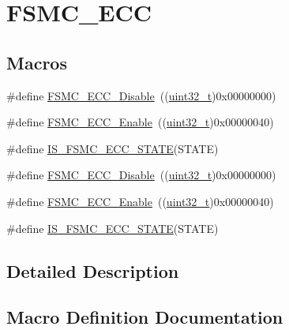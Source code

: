 \hypertarget{group___f_s_m_c___e_c_c}{}\section{F\+S\+M\+C\+\_\+\+E\+CC}
\label{group___f_s_m_c___e_c_c}
\subsection*{Macros}
\begin{DoxyCompactItemize}
\item 
\#define \hyperlink{group___f_s_m_c___e_c_c_ga9a3264c0718f5023fd106abea7ef806d}{F\+S\+M\+C\+\_\+\+E\+C\+C\+\_\+\+Disable}~((\hyperlink{_p_e___types_8h_a33594304e786b158f3fb30289278f5af}{uint32\+\_\+t})0x00000000)
\item 
\#define \hyperlink{group___f_s_m_c___e_c_c_ga9d940243830695412d4c98228bb5b763}{F\+S\+M\+C\+\_\+\+E\+C\+C\+\_\+\+Enable}~((\hyperlink{_p_e___types_8h_a33594304e786b158f3fb30289278f5af}{uint32\+\_\+t})0x00000040)
\item 
\#define \hyperlink{group___f_s_m_c___e_c_c_gaf1a7cb45edd8707bf4ea8aac96799c77}{I\+S\+\_\+\+F\+S\+M\+C\+\_\+\+E\+C\+C\+\_\+\+S\+T\+A\+TE}(S\+T\+A\+TE)
\item 
\#define \hyperlink{group___f_s_m_c___e_c_c_ga9a3264c0718f5023fd106abea7ef806d}{F\+S\+M\+C\+\_\+\+E\+C\+C\+\_\+\+Disable}~((\hyperlink{_p_e___types_8h_a33594304e786b158f3fb30289278f5af}{uint32\+\_\+t})0x00000000)
\item 
\#define \hyperlink{group___f_s_m_c___e_c_c_ga9d940243830695412d4c98228bb5b763}{F\+S\+M\+C\+\_\+\+E\+C\+C\+\_\+\+Enable}~((\hyperlink{_p_e___types_8h_a33594304e786b158f3fb30289278f5af}{uint32\+\_\+t})0x00000040)
\item 
\#define \hyperlink{group___f_s_m_c___e_c_c_gaf1a7cb45edd8707bf4ea8aac96799c77}{I\+S\+\_\+\+F\+S\+M\+C\+\_\+\+E\+C\+C\+\_\+\+S\+T\+A\+TE}(S\+T\+A\+TE)
\end{DoxyCompactItemize}


\subsection{Detailed Description}


\subsection{Macro Definition Documentation}
